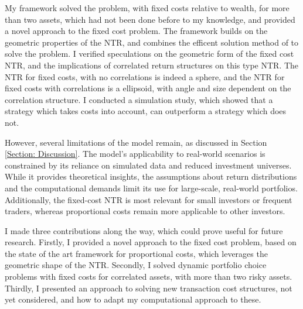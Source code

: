\documentclass[11pt]{article}
\begin{document}
My framework solved the problem, with fixed costs relative to wealth, for more than two assets, which had not been done before to my knowledge, and provided a novel approach to the fixed cost problem.
The framework builds on the geometric properties of the \ac{NTR}, and combines the efficent solution method of \autocite{Scheidegger2023} to solve the problem.
I verified speculations on the geometric form of the fixed cost \ac{NTR}, and the implications of correlated return structures on this type \ac{NTR}.
The \ac{NTR} for fixed costs, with no correlations is indeed a sphere, and the \ac{NTR} for fixed costs with correlations is a ellipsoid, with angle and size dependent on the correlation structure.
I conducted a simulation study, which showed that a strategy which takes costs into account, can outperform a strategy which does not.

However, several limitations of the model remain, as discussed in Section \ref{Section: Discussion}.
The model’s applicability to real-world scenarios is constrained by its reliance on simulated data and reduced investment universes.
While it provides theoretical insights, the assumptions about return distributions and the computational demands limit its use for large-scale, real-world portfolios.
Additionally, the fixed-cost \ac{NTR} is most relevant for small investors or frequent traders, whereas proportional costs remain more applicable to other investors. 

I made three contributions along the way, which could prove useful for future research.
Firstly, I provided a novel approach to the fixed cost problem, based on the state of the art framework for proportional costs, which leverages the geometric shape of the \ac{NTR}.
Secondly, I solved dynamic portfolio choice problems with fixed costs for correlated assets, with more than two risky assets.
Thirdly, I presented an approach to solving new transaction cost structures, not yet considered, and how to adapt my computational approach to these.


\ifdefined\COMPILINGMAIN
\else
\end{document}

